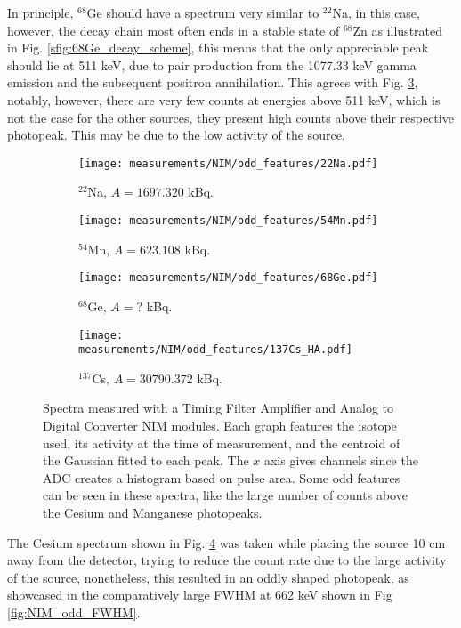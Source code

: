 In principle, $^{68}$Ge should have a spectrum very similar to $^{22}$Na, in this case, however, the decay chain most often ends in a stable state of $^{68}$Zn as illustrated in Fig. \ref{sfig:68Ge_decay_scheme}, this means that the only appreciable peak should lie at 511 \unit{\kilo\eV}, due to pair production from the 1077.33 \unit{\kilo\eV} gamma emission and the subsequent positron annihilation. This agrees with Fig. \ref{sfig:NIM_odd_68Ge}, notably, however, there are very few counts at energies above 511 \unit{\kilo\eV}, which is not the case for the other sources, they present high counts above their respective photopeak. This may be due to the low activity of the source. 

\begin{figure}[H]
  \begin{subfigure}[t]{0.47\textwidth}
    \centering
    \texttt{[image: measurements/NIM/odd\_features/22Na.pdf]}
    \caption{\label{sfig:NIM_odd_22Na}$^{22}$Na, $A=1697.320$ kBq.}
  \end{subfigure}
  \hfill
  \begin{subfigure}[t]{0.47\textwidth}
    \centering
    \texttt{[image: measurements/NIM/odd\_features/54Mn.pdf]}
    \caption{\label{sfig:NIM_odd_54Mn}$^{54}$Mn, $A=623.108$ kBq.}
  \end{subfigure}
  \medskip
  \begin{subfigure}[t]{0.47\textwidth}
    \centering
    \texttt{[image: measurements/NIM/odd\_features/68Ge.pdf]}
    \caption{\label{sfig:NIM_odd_68Ge}$^{68}$Ge, $A=$? kBq.}
  \end{subfigure}
  \hfill
  \begin{subfigure}[t]{0.47\textwidth}
    \centering
    \texttt{[image: measurements/NIM/odd\_features/137Cs\_HA.pdf]}
    \caption{\label{sfig:NIM_odd_137Cs}$^{137}$Cs, $A=30790.372$ kBq.}
  \end{subfigure}
  \caption{\label{fig:NIM_odd_features}Spectra measured with a Timing Filter Amplifier and Analog to Digital Converter NIM modules. Each graph features the isotope used, its activity at the time of measurement, and the centroid of the Gaussian fitted to each peak. The $x$ axis gives channels since the ADC creates a histogram based on pulse area. Some odd features can be seen in these spectra, like the large number of counts above the Cesium and Manganese photopeaks.}
\end{figure}

The Cesium spectrum shown in Fig. \ref{sfig:NIM_odd_137Cs} was taken while placing the source 10 cm away from the detector, trying to reduce the count rate due to the large activity of the source, nonetheless, this resulted in an oddly shaped photopeak, as showcased in the comparatively large FWHM at 662 keV shown in Fig \ref{fig:NIM_odd_FWHM}.  

